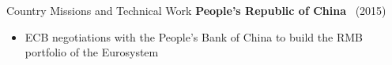 \documentclass[usegeometry, 10pt, a4paper]{cv} %
\newcommand{\activite}[1]{\textbf{#1}\ }
\newcommand{\midreduce}{-0.5cm}
\begin{document}
\begin{rubriquetableau}[0.95\textwidth]{Country Missions and Technical Work}
  \activite{People's Republic of China} (2015)\\
  \vspace{\midreduce}
  \begin{itemize}[label={}]
    \item \small{ECB negotiations with the People's Bank of China to build the
        RMB portfolio of the Eurosystem}
  \end{itemize}

\normalsize
\end{rubriquetableau}

\newpage


\end{document}
